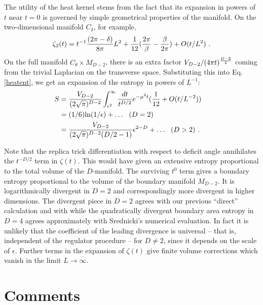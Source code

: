 \documentclass[12pt]{article}
\begin{document}
The utility of the heat kernel stems from the fact that its expansion
in powers of $t$ near $t=0$ is governed by simple geometrical properties
of the manifold\cite{balian,alvarez}. On the two-dimensional manifold
$C_\delta$, for example,
\begin{equation}
\zeta_2(t) = t^{-1}{(2\pi-\delta)\over 8\pi} L^2 +
	{1\over {12}} ({2\pi \over \beta} - {\beta \over 2\pi})
+ O(t/L^2) ~.
\end{equation}
On the full manifold $C_\theta\times M_{D-2}$, there is an extra factor
$V_{D-2}/(4\pi t)^{{D-2\over 2}}$ coming from the trivial Laplacian on the
transverse space. Substituting this into Eq.\ref{heatent}, we get an
expansion of the entropy in powers of $L^{-1}$:
\begin{align}
S & = {V_{D-2}\over(2\sqrt{\pi})^{D-2}}\int_{\epsilon^2}^\infty {dt\over
t^{D/2}}
	e^{-\mu^2 t}({1\over 12}+O(t/L^{-2}))\cr
    & = (1/6){\rm ln}(1/\epsilon) + \ldots~~(D=2)\cr
    & = {V_{D-2}\over(2\sqrt{\pi})^{D-2}(D/2-1)}\epsilon^{2-D}+\ldots~~(D>2)~.
\end{align}

Note that the replica trick differentiation with respect to deficit
angle annihilates the $t^{-D/2}$ term in $\zeta(t)$. This would have given
an extensive entropy proportional to the total volume of the $D$-manifold.
The surviving $t^{0}$ term gives a boundary entropy proportional to the volume
of the boundary manifold $M_{D-2}$. It is logarithmically divergent in $D=2$
and correspondingly more divergent in higher dimensions. The divergent piece in
$D=2$ agrees with our previous ``direct'' calculation and with \cite{Holzhey}
while the quadratically divergent boundary area entropy in
$D=4$ agrees approximately with
 Srednicki's numerical evaluation\cite{Srednicki}. In fact it is
unlikely that the coefficient of the leading divergence is
universal -- that is, independent of the regulator
procedure -- for $D \not= 2$, since it depends on the scale of
$\epsilon$.
Further terms in the expansion of $\zeta(t)$ give
finite volume corrections which vanish in the limit $L\to\infty$.

\section{Comments}
\end{document}
